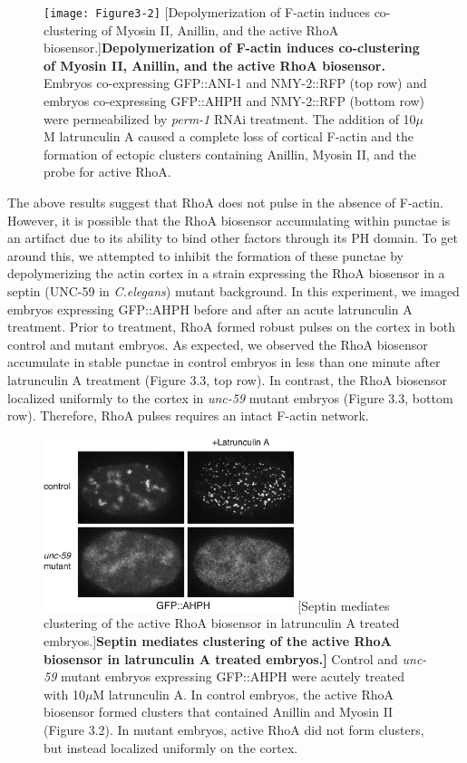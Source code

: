 \documentclass{ucetd}
\begin{document}
\begin{figure}[!htbp]
\centering
\texttt{[image: Figure3-2]}
[Depolymerization of F-actin induces co-clustering of Myosin II, Anillin, and the active RhoA biosensor.]{\textbf{Depolymerization of F-actin induces co-clustering of Myosin II, Anillin, and the active RhoA biosensor.} Embryos co-expressing GFP::ANI-1 and NMY-2::RFP (top row) and embryos co-expressing GFP::AHPH and NMY-2::RFP (bottom row) were permeabilized by \textit{perm-1} RNAi treatment.  The addition of 10$\mu$M latrunculin A caused a complete loss of cortical F-actin and the formation of ectopic clusters containing Anillin, Myosin II, and the probe for active RhoA.}
\end{figure}

The above results suggest that RhoA does not pulse in the absence of F-actin.  However, it is possible that the RhoA biosensor accumulating within punctae is an artifact due to its ability to bind other factors through its PH domain.  To get around this, we attempted to inhibit the formation of these punctae by depolymerizing the actin cortex in a strain expressing the RhoA biosensor in a septin (UNC-59 in \textit{C.elegans}) mutant background.  In this experiment, we imaged embryos expressing GFP::AHPH before and after an acute latrunculin A treatment.  Prior to treatment, RhoA formed robust pulses on the cortex in both control and mutant embryos.  As expected, we observed the RhoA biosensor accumulate in stable punctae in control embryos in less than one minute after latrunculin A treatment (Figure 3.3, top row).  In contrast, the RhoA biosensor localized uniformly to the cortex in \textit{unc-59} mutant embryos (Figure 3.3, bottom row).  Therefore, RhoA pulses requires an intact F-actin network.
\begin{figure}[!htbp]
\centering
\includegraphics[width=0.65\textwidth]{Figure3-3}
[Septin mediates clustering of the active RhoA biosensor in latrunculin A treated embryos.]{\textbf{Septin mediates clustering of the active RhoA biosensor in latrunculin A treated embryos.]} Control and \textit{unc-59} mutant embryos expressing GFP::AHPH were acutely treated with 10$\mu$M latrunculin A.  In control embryos, the active RhoA biosensor formed clusters that contained Anillin and Myosin II (Figure 3.2).  In mutant embryos, active RhoA did not form clusters, but instead localized uniformly on the cortex.}
\end{figure}
\end{document}
